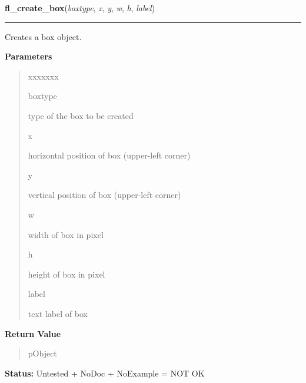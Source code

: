 \hspace{.8\funcindent}\begin{boxedminipage}{\funcwidth}

    \raggedright \textbf{fl\_create\_box}(\textit{boxtype}, \textit{x}, \textit{y}, \textit{w}, \textit{h}, \textit{label})

    \vspace{-1.5ex}

    \rule{\textwidth}{0.5\fboxrule}
\setlength{\parskip}{2ex}
    Creates a box object.

\setlength{\parskip}{1ex}
      \textbf{Parameters}
      \vspace{-1ex}

      \begin{quote}
        \begin{Ventry}{xxxxxxx}

          \item[boxtype]

          type of the box to be created

          \item[x]

          horizontal position of box (upper-left corner)

          \item[y]

          vertical position of box (upper-left corner)

          \item[w]

          width of box in pixel

          \item[h]

          height of box in pixel

          \item[label]

          text label of box

        \end{Ventry}

      \end{quote}

      \textbf{Return Value}
    \vspace{-1ex}

      \begin{quote}
      pObject

      \end{quote}

\textbf{Status:} Untested + NoDoc + NoExample = NOT OK



    \end{boxedminipage}

